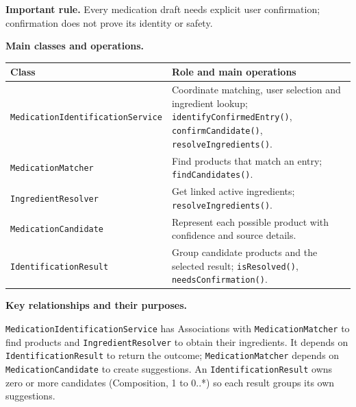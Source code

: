 \noindent\textbf{Important rule.} Every medication draft needs explicit user
confirmation; confirmation does not prove its identity or safety.



\noindent\textbf{Main classes and operations.}\par\smallskip
\begingroup\small
\begin{tabularx}{\textwidth}{|L{0.37\textwidth}|Y|}
\hline
\textbf{Class} & \textbf{Role and main operations} \\ \hline
\texttt{MedicationIdentificationService} & Coordinate matching, user selection and ingredient lookup; \texttt{identifyConfirmedEntry()}, \texttt{confirmCandidate()}, \texttt{resolveIngredients()}. \\ \hline
\texttt{MedicationMatcher} & Find products that match an entry; \texttt{findCandidates()}. \\ \hline
\texttt{IngredientResolver} & Get linked active ingredients; \texttt{resolveIngredients()}. \\ \hline
\texttt{MedicationCandidate} & Represent each possible product with confidence and source details. \\ \hline
\texttt{IdentificationResult} & Group candidate products and the selected result; \texttt{isResolved()}, \texttt{needsConfirmation()}. \\ \hline
\end{tabularx}
\endgroup

\noindent\textbf{Key relationships and their purposes.}\par\smallskip
\texttt{MedicationIdentificationService} has Associations with
\texttt{MedicationMatcher} to find products and \texttt{IngredientResolver}
to obtain their ingredients. It depends on \texttt{IdentificationResult}
to return the outcome; \texttt{MedicationMatcher} depends on
\texttt{MedicationCandidate} to create suggestions. An
\texttt{IdentificationResult} owns zero or more candidates
(Composition, 1 to 0..*) so each result groups its own suggestions.

